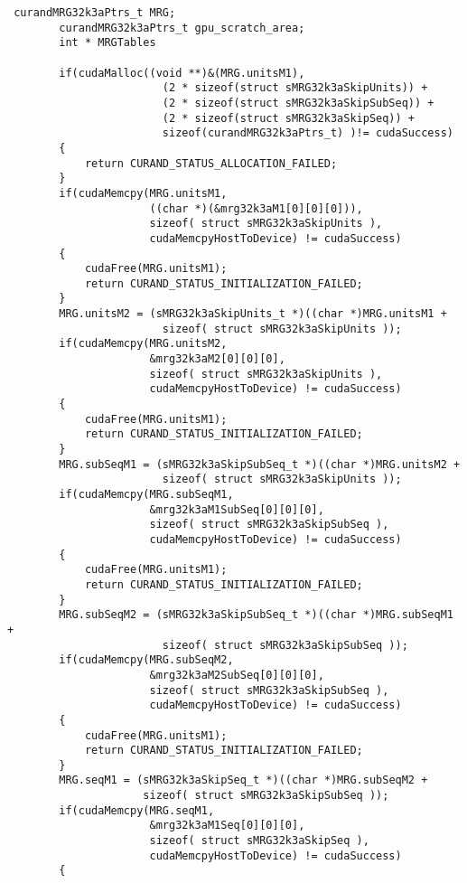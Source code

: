 \begin{verbatim}
 curandMRG32k3aPtrs_t MRG;
        curandMRG32k3aPtrs_t gpu_scratch_area;
        int * MRGTables

        if(cudaMalloc((void **)&(MRG.unitsM1),
                        (2 * sizeof(struct sMRG32k3aSkipUnits)) + 
                        (2 * sizeof(struct sMRG32k3aSkipSubSeq)) + 
                        (2 * sizeof(struct sMRG32k3aSkipSeq)) +
                        sizeof(curandMRG32k3aPtrs_t) )!= cudaSuccess)
        {
            return CURAND_STATUS_ALLOCATION_FAILED;
        }
        if(cudaMemcpy(MRG.unitsM1,
                      ((char *)(&mrg32k3aM1[0][0][0])),
                      sizeof( struct sMRG32k3aSkipUnits ), 
                      cudaMemcpyHostToDevice) != cudaSuccess)
        {
            cudaFree(MRG.unitsM1);
            return CURAND_STATUS_INITIALIZATION_FAILED;
        }
        MRG.unitsM2 = (sMRG32k3aSkipUnits_t *)((char *)MRG.unitsM1 + 
                        sizeof( struct sMRG32k3aSkipUnits ));
        if(cudaMemcpy(MRG.unitsM2, 
                      &mrg32k3aM2[0][0][0],
                      sizeof( struct sMRG32k3aSkipUnits ), 
                      cudaMemcpyHostToDevice) != cudaSuccess)
        {
            cudaFree(MRG.unitsM1);
            return CURAND_STATUS_INITIALIZATION_FAILED;
        }
        MRG.subSeqM1 = (sMRG32k3aSkipSubSeq_t *)((char *)MRG.unitsM2 + 
                        sizeof( struct sMRG32k3aSkipUnits ));
        if(cudaMemcpy(MRG.subSeqM1, 
                      &mrg32k3aM1SubSeq[0][0][0],
                      sizeof( struct sMRG32k3aSkipSubSeq ), 
                      cudaMemcpyHostToDevice) != cudaSuccess)
        {
            cudaFree(MRG.unitsM1);
            return CURAND_STATUS_INITIALIZATION_FAILED;
        }
        MRG.subSeqM2 = (sMRG32k3aSkipSubSeq_t *)((char *)MRG.subSeqM1 + 
                        sizeof( struct sMRG32k3aSkipSubSeq ));
        if(cudaMemcpy(MRG.subSeqM2, 
                      &mrg32k3aM2SubSeq[0][0][0],
                      sizeof( struct sMRG32k3aSkipSubSeq ), 
                      cudaMemcpyHostToDevice) != cudaSuccess)
        {
            cudaFree(MRG.unitsM1);
            return CURAND_STATUS_INITIALIZATION_FAILED;
        }
        MRG.seqM1 = (sMRG32k3aSkipSeq_t *)((char *)MRG.subSeqM2 + 
                     sizeof( struct sMRG32k3aSkipSubSeq ));
        if(cudaMemcpy(MRG.seqM1, 
                      &mrg32k3aM1Seq[0][0][0],
                      sizeof( struct sMRG32k3aSkipSeq ), 
                      cudaMemcpyHostToDevice) != cudaSuccess)
        {

\end{verbatim}
